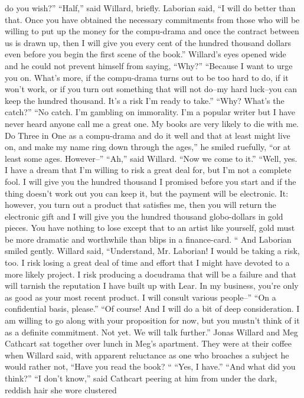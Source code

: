 \documentclass[a4paper,12pt]{article}
\begin{document}
do you wish?”
“Half,” said Willard, briefly.
Laborian said, “I will do better than that. Once you have obtained the necessary commitments
from those who will be willing to put up the money for the compu-drama and once the contract between us
is drawn up, then I will give you every cent of the hundred thousand dollars even before you begin the first
scene of the book.”
Willard’s eyes opened wide and he could not prevent himself from saying, “Why?”
“Because I want to urge you on. What’s more, if the compu-drama turns out to be too hard to do,
if it won’t work, or if you turn out something that will not do--my hard luck--you can keep the hundred
thousand. It’s a risk I’m ready to take.”
“Why? What’s the catch?”
“No catch. I’m gambling on immorality. I’m a popular writer but I have never heard anyone call
me a great one. My books are very likely to die with me. Do Three in One as a compu-drama and do it well
and that at least might live on, and make my name ring down through the ages,” he smiled ruefully, “or at
least some ages. However--”
“Ah,” said Willard. “Now we come to it.”
“Well, yes. I have a dream that I’m willing to risk a great deal for, but I’m not a complete fool. I
will give you the hundred thousand I promised before you start and if the thing doesn’t work out you can
keep it, but the payment will be electronic. It: however, you turn out a product that satisfies me, then you
will return the electronic gift and I will give you the hundred thousand globo-dollars in gold pieces. You
have nothing to lose except that to an artist like yourself, gold must be more dramatic and worthwhile than
blips in a finance-card. “ And Laborian smiled gently.
Willard said, “Understand, Mr. Laborian! I would be taking a risk, too. I risk losing a great deal of
time and effort that I might have devoted to a more likely project. I risk producing a docudrama that will be
a failure and that will tarnish the reputation I have built up with Lear. In my business, you’re only as good
as your most recent product. I will consult various people--”
“On a confidential basis, please.”
“Of course! And I will do a bit of deep consideration. I am willing to go along with your
proposition for now, but you mustn’t think of it as a definite commitment. Not yet. We will talk further.”
Jonas Willard and Meg Cathcart sat together over lunch in Meg’s apartment. They were at their
coffee when Willard said, with apparent reluctance as one who broaches a subject he would rather not,
“Have you read the book? “
“Yes, I have.”
“And what did you think?”
“I don’t know,” said Cathcart peering at him from under the dark, reddish hair she wore clustered
\end{document}
